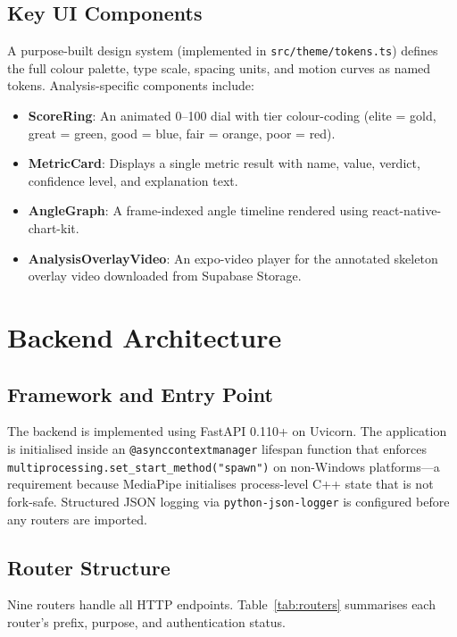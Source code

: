 \subsection{Key UI Components}

A purpose-built design system (implemented in \lstinline|src/theme/tokens.ts|) defines the full colour palette, type scale, spacing units, and motion curves as named tokens. Analysis-specific components include:

\begin{itemize}
  \item \textbf{ScoreRing}: An animated 0--100 dial with tier colour-coding (elite = gold, great = green, good = blue, fair = orange, poor = red).
  \item \textbf{MetricCard}: Displays a single metric result with name, value, verdict, confidence level, and explanation text.
  \item \textbf{AngleGraph}: A frame-indexed angle timeline rendered using react-native-chart-kit.
  \item \textbf{AnalysisOverlayVideo}: An expo-video player for the annotated skeleton overlay video downloaded from Supabase Storage.
\end{itemize}

\section{Backend Architecture}
\label{sec:backend_arch}

\subsection{Framework and Entry Point}

The backend is implemented using FastAPI 0.110+ on Uvicorn. The application is initialised inside an \lstinline|@asynccontextmanager| lifespan function that enforces \lstinline|multiprocessing.set_start_method("spawn")| on non-Windows platforms---a requirement because MediaPipe initialises process-level C++ state that is not fork-safe. Structured JSON logging via \lstinline|python-json-logger| is configured before any routers are imported.

\subsection{Router Structure}

Nine routers handle all HTTP endpoints. Table~\ref{tab:routers} summarises each router's prefix, purpose, and authentication status.

